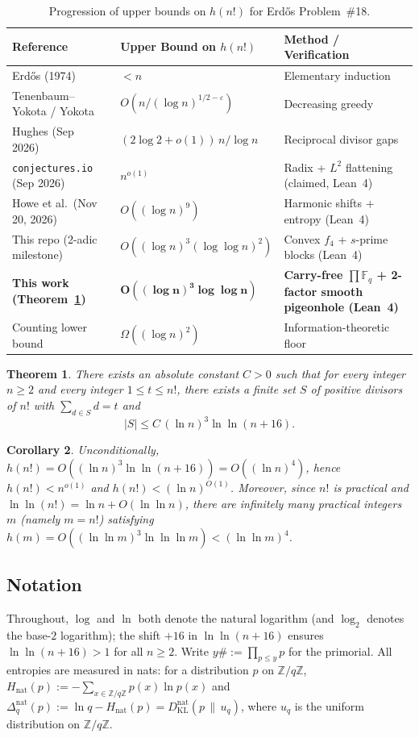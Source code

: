 \documentclass[11pt,a4paper]{amsart}
\newtheorem{theorem}{Theorem}[section]
\newtheorem{corollary}[theorem]{Corollary}
\theoremstyle{definition}
\theoremstyle{remark}
\newcommand{\Z}{\mathbb{Z}}
\newcommand{\F}{\mathbb{F}}
\begin{document}
\begin{table}[ht]
\centering
\small
\caption{Progression of upper bounds on $h(n!)$ for Erd\H{o}s Problem~\#18.}\label{tab:history}
\begin{tabular}{@{}llp{5.5cm}@{}}
\toprule
Reference & Upper Bound on $h(n!)$ & Method / Verification \\
\midrule
Erd\H{o}s (1974)~\cite{Er74b} & $< n$ & Elementary induction \\
Tenenbaum--Yokota / Yokota~\cite{TY90,Yo95} & $O(n/(\log n)^{1/2-\varepsilon})$ & Decreasing greedy \\
Hughes (Sep 2026)~\cite{Hughes26} & $(2\log 2 + o(1))\,n/\log n$ & Reciprocal divisor gaps \\
\texttt{conjectures.io} (Sep 2026) & $n^{o(1)}$ & Radix + $L^2$ flattening (claimed, Lean~4) \\
Howe et al.\ (Nov 20, 2026)~\cite{HHKK26} & $O((\log n)^9)$ & Harmonic shifts + entropy (Lean~4) \\
This repo (2-adic milestone) & $O((\log n)^3(\log\log n)^2)$ & Convex $f_4$ + $s$-prime blocks (Lean~4) \\
\textbf{This work (Theorem~\ref{thm:main})} & $\boldsymbol{O((\log n)^3\log\log n)}$ & \textbf{Carry-free $\prod \F_q$ + 2-factor smooth pigeonhole (Lean~4)} \\
\midrule
Counting lower bound & $\Omega((\log n)^2)$ & Information-theoretic floor \\
\bottomrule
\end{tabular}
\end{table}

\begin{theorem}\label{thm:main}
There exists an absolute constant $C > 0$ such that for every integer $n \ge 2$ and every integer $1 \le t \le n!$, there exists a finite set $S$ of positive divisors of $n!$ with $\sum_{d \in S} d = t$ and
\[
  |S| \le C\, (\ln n)^3 \ln\ln(n+16).
\]
\end{theorem}

\begin{corollary}\label{cor:all3}
Unconditionally, $h(n!) = O((\ln n)^3 \ln\ln(n+16)) = O((\ln n)^4)$, hence $h(n!) < n^{o(1)}$ and $h(n!) < (\ln n)^{O(1)}$. Moreover, since $n!$ is practical and $\ln\ln(n!) = \ln n + O(\ln\ln n)$, there are infinitely many practical integers $m$ (namely $m = n!$) satisfying $h(m) = O((\ln\ln m)^3 \ln\ln\ln m) < (\ln\ln m)^4$.
\end{corollary}

\subsection*{Notation}
Throughout, $\log$ and $\ln$ both denote the natural logarithm (and $\log_2$ denotes the base-$2$ logarithm); the shift $+16$ in $\ln\ln(n+16)$ ensures $\ln\ln(n+16) > 1$ for all $n \ge 2$. Write $y\# := \prod_{p \le y} p$ for the primorial. All entropies are measured in nats: for a distribution $p$ on $\Z/q\Z$, $H_{\mathrm{nat}}(p) := -\sum_{x \in \Z/q\Z} p(x)\ln p(x)$ and $\Delta_q^{\mathrm{nat}}(p) := \ln q - H_{\mathrm{nat}}(p) = D_{\mathrm{KL}}^{\mathrm{nat}}(p \,\|\, u_q)$, where $u_q$ is the uniform distribution on $\Z/q\Z$.
\end{document}
